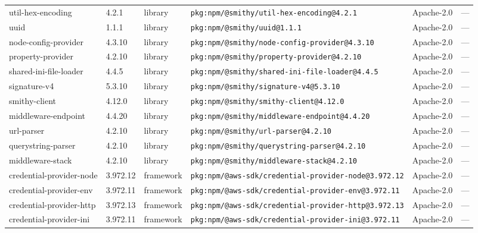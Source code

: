 \documentclass[11pt,a4paper]{article}
\begin{document}
\begin{longtable}{|p{4cm}|p{2cm}|p{1.6cm}|p{5cm}|p{1.5cm}|p{3.5cm}|}
\raggedright util-hex-encoding & 4.2.1 & library & \small\texttt{pkg:npm/@smithy/util-hex-encoding@4.2.1} & Apache-2.0 & \small — \\
\raggedright uuid & 1.1.1 & library & \small\texttt{pkg:npm/@smithy/uuid@1.1.1} & Apache-2.0 & \small — \\
\raggedright node-config-provider & 4.3.10 & library & \small\texttt{pkg:npm/@smithy/node-config-provider@4.3.10} & Apache-2.0 & \small — \\
\raggedright property-provider & 4.2.10 & library & \small\texttt{pkg:npm/@smithy/property-provider@4.2.10} & Apache-2.0 & \small — \\
\raggedright shared-ini-file-loader & 4.4.5 & library & \small\texttt{pkg:npm/@smithy/shared-ini-file-loader@4.4.5} & Apache-2.0 & \small — \\
\raggedright signature-v4 & 5.3.10 & library & \small\texttt{pkg:npm/@smithy/signature-v4@5.3.10} & Apache-2.0 & \small — \\
\raggedright smithy-client & 4.12.0 & library & \small\texttt{pkg:npm/@smithy/smithy-client@4.12.0} & Apache-2.0 & \small — \\
\raggedright middleware-endpoint & 4.4.20 & library & \small\texttt{pkg:npm/@smithy/middleware-endpoint@4.4.20} & Apache-2.0 & \small — \\
\raggedright url-parser & 4.2.10 & library & \small\texttt{pkg:npm/@smithy/url-parser@4.2.10} & Apache-2.0 & \small — \\
\raggedright querystring-parser & 4.2.10 & library & \small\texttt{pkg:npm/@smithy/querystring-parser@4.2.10} & Apache-2.0 & \small — \\
\raggedright middleware-stack & 4.2.10 & library & \small\texttt{pkg:npm/@smithy/middleware-stack@4.2.10} & Apache-2.0 & \small — \\
\raggedright credential-provider-node & 3.972.12 & framework & \small\texttt{pkg:npm/@aws-sdk/credential-provider-node@3.972.12} & Apache-2.0 & \small — \\
\raggedright credential-provider-env & 3.972.11 & framework & \small\texttt{pkg:npm/@aws-sdk/credential-provider-env@3.972.11} & Apache-2.0 & \small — \\
\raggedright credential-provider-http & 3.972.13 & framework & \small\texttt{pkg:npm/@aws-sdk/credential-provider-http@3.972.13} & Apache-2.0 & \small — \\
\raggedright credential-provider-ini & 3.972.11 & framework & \small\texttt{pkg:npm/@aws-sdk/credential-provider-ini@3.972.11} & Apache-2.0 & \small — \\

\end{longtable}
\end{document}
